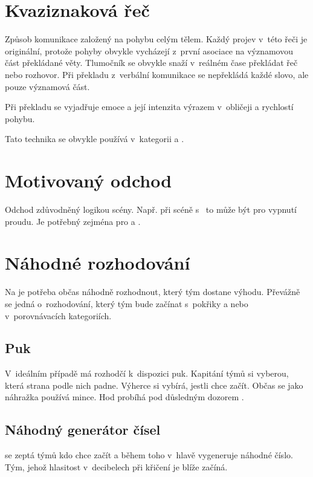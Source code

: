  
 
\needspace{5cm} \section{Kvaziznaková řeč} \label{kvaziznaková řeč} Způsob komunikace založený na pohybu celým tělem. Každý projev v~této řeči je originální, protože pohyby obvykle vycházejí z~první asociace na významovou část překládané věty. Tlumočník se obvykle snaží v~reálném čase překládat řeč nebo rozhovor. Při překladu z~verbální komunikace se nepřekládá každé slovo, ale pouze významová část. 
 
Při překladu se vyjadřuje emoce a její intenzita výrazem v~obličeji a rychlostí pohybu. 
 
Tato technika se obvykle používá v~kategorii  a . 
 
 
\needspace{5cm} \section{Motivovaný odchod} \label{motivovaný odchod} Odchod zdůvodněný logikou scény. Např. při scéně s~ to může být pro vypnutí proudu. Je potřebný zejména pro  a . 
 
 
\needspace{5cm} \section{Náhodné rozhodování} \label{náhodné rozhodování} Na  je potřeba občas náhodně rozhodnout, který tým dostane výhodu. Převážně se jedná o~rozhodování, který tým bude začínat s~pokřiky a nebo v~porovnávacích kategoriích. 
 
\subsection{ Puk } V~ideálním případě má rozhodčí k~dispozici puk. Kapitání týmů si vyberou, která strana podle nich padne. Výherce si vybírá, jestli chce začít. Občas se jako náhražka používá mince. Hod probíhá pod důsledným dozorem . 
 
\subsection{ Náhodný generátor čísel }  se zeptá týmů kdo chce začít a během toho v~hlavě vygeneruje náhodné číslo. Tým, jehož hlasitost v~decibelech při křičení   je blíže začíná. 
 
